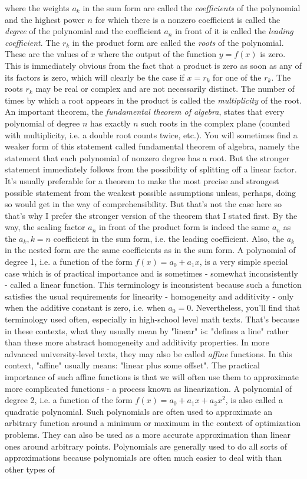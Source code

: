 where the weights $a_k$ in the sum form are called the \emph{coefficients} of the polynomial and the highest power $n$ for which there is a nonzero coefficient is called the \emph{degree} of the polynomial and the coefficient $a_n$ in front of it is called the \emph{leading coefficient}. The $r_k$ in the product form are called the \emph{roots} of the polynomial. These are the values of $x$ where the output of the function $y = f(x)$ is zero. This is immediately obvious from the fact that a product is zero as soon as any of its factors is zero, which will clearly be the case if $x = r_k$ for one of the $r_k$. The roots $r_k$ may be real or complex and are not necessarily distinct. The number of times by which a root appears in the product is called the \emph{multiplicity} of the root. An important theorem, the \emph{fundamental theorem of algebra}, states that every polynomial of degree $n$ has exactly $n$ such roots in the complex plane (counted with multiplicity, i.e. a double root counts twice, etc.). You will sometimes find a weaker form of this statement called fundamental theorem of algebra, namely the statement that each polynomial of nonzero degree has a root. But the stronger statement immediately follows from the possibility of splitting off a linear factor. It's usually preferable for a theorem to make the most precise and strongest possible statement from the weakest possible assumptions unless, perhaps, doing so would get in the way of comprehensibility. But that's not the case here so that's why I prefer the stronger version of the theorem that I stated first. By the way, the scaling factor $a_n$ in front of the product form is indeed the same $a_n$ as the $a_k, k=n$ coefficient in the sum form, i.e. the leading coefficient. Also, the $a_k$ in the nested form are the same coefficients as in the sum form. A polynomial of degree 1, i.e. a function of the form $f(x) = a_0 + a_1  x$, is a very simple special case which is of practical importance and is sometimes - somewhat inconsistently - called a linear function. This terminology is inconsistent because such a function satisfies the usual requirements for linearity - homogeneity and additivity - only when the additive constant is zero, i.e. when $a_0 = 0$. Nevertheless, you'll find that terminology used often, especially in high-school level math texts. That's because in these contexts, what they usually mean by "linear" is: "defines a line" rather than these more abstract homogeneity and additivity properties. In more advanced university-level texts, they may also be called \emph{affine} functions. In this context, "affine" usually means: "linear plus some offset". The practical importance of such affine functions is that we will often use them to approximate more complicated functions - a process known as linearization. A polynomial of degree 2, i.e. a function of the form $f(x) = a_0 + a_1 x + a_2 x^2$, is also called a quadratic polynomial. Such polynomials are often used to approximate an arbitrary function around a minimum or maximum in the context of optimization problems. They can also be used as a more accurate approximation than linear ones around arbitrary points. Polynomials are generally used to do all sorts of approximations because polynomials are often much easier to deal with than other types of 